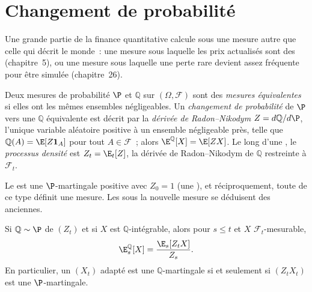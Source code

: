 \section{Changement de probabilité}\label{sec:qm:probability-at-speed:measure}

Une grande partie de la finance quantitative calcule sous une mesure autre que celle qui décrit le
monde~: une mesure sous laquelle les prix actualisés sont des  (chapitre~5), ou une mesure sous laquelle une
perte rare devient assez fréquente pour être simulée (chapitre~26).

\begin{definition}\label{def:qm:probability-at-speed:change}
Deux mesures de probabilité $\P$ et $\mathbb Q$ sur $(\Omega, \mathcal F)$ sont
des \emph{mesures équivalentes} si elles ont les mêmes ensembles négligeables. Un
\emph{changement de probabilité} de $\P$ vers une $\mathbb Q$ équivalente est
décrit par la \emph{dérivée de Radon--Nikodym} $Z =
d\mathbb Q/d\P$, l'unique variable aléatoire positive à un ensemble négligeable près, telle que $\mathbb Q(A) =
\E[Z\mathbf 1_A]$ pour tout $A \in \mathcal F$~; alors $\E^{\mathbb Q}[X] = \E[ZX]$. Le long d'une
, le \emph{processus densité} est $Z_t = \E_t[Z]$, la
dérivée de Radon--Nikodym de $\mathbb Q$ restreinte à $\mathcal F_t$.
\end{definition}

Le  est une $\P$-martingale positive avec $Z_0 = 1$ (une ), et
réciproquement, toute  de ce type définit une mesure. Les  sous la nouvelle
mesure se déduisent des anciennes.

\begin{proposition}\label{prop:qm:probability-at-speed:bayes}
Si $\mathbb Q \sim \P$ de  $(Z_t)$ et si $X$ est $\mathbb Q$-intégrable, alors
pour $s \le t$ et $X$ $\mathcal F_t$-mesurable,
\[
\E^{\mathbb Q}_s[X] = \frac{\E_s[Z_tX]}{Z_s}.
\]
En particulier, un $(X_t)$ adapté est une $\mathbb Q$-martingale si et seulement si $(Z_tX_t)$ est une
$\P$-martingale.
\end{proposition}

